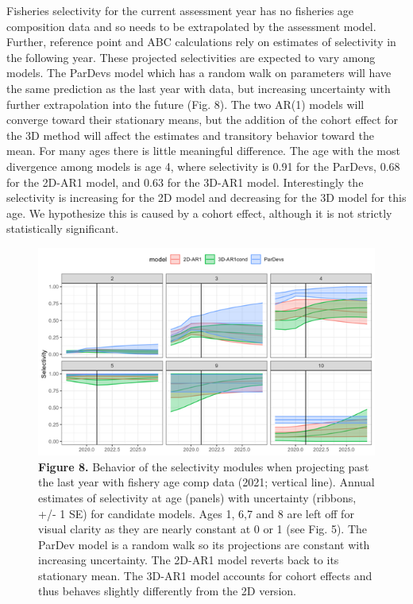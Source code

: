 \documentclass[
]{article}
\begin{document}
{{{Fisheries selectivity for the current assessment year has no fisheries
age composition data and so needs to be extrapolated by the assessment
model. Further, reference point and ABC calculations rely on estimates
of selectivity in the following year. These projected selectivities are
expected to vary among models. The ParDevs model which has a random walk
on parameters will have the same prediction as the last year with data,
but increasing uncertainty with further extrapolation into the future
(Fig. 8). The two AR(1) models will converge toward their stationary
means, but the addition of the cohort effect for the 3D method will
affect the estimates and transitory behavior toward the mean. For many
ages there is little meaningful difference. The age with the most
divergence among models is age 4, where selectivity is 0.91 for the
ParDevs, 0.68 for the 2D-AR1 model, and 0.63 for the 3D-AR1 model.
Interestingly the selectivity is increasing for the 2D model and
decreasing for the 3D model for this age. We hypothesize this is caused
by a cohort effect, although it is not strictly statistically
significant.

\begin{figure}
\hypertarget{fig:figure8}{%
\centering
\includegraphics{Results/Figure8_projected_sel.png}
\caption{\textbf{Figure 8.} Behavior of the selectivity modules when
projecting past the last year with fishery age comp data (2021; vertical
line). Annual estimates of selectivity at age (panels) with uncertainty
(ribbons, +/- 1 SE) for candidate models. Ages 1, 6,7 and 8 are left off
for visual clarity as they are nearly constant at 0 or 1 (see Fig. 5).
The ParDev model is a random walk so its projections are constant with
increasing uncertainty. The 2D-AR1 model reverts back to its stationary
mean. The 3D-AR1 model accounts for cohort effects and thus behaves
slightly differently from the 2D version.}\label{fig:figure8}
}
\end{figure}

}}}
\end{document}

